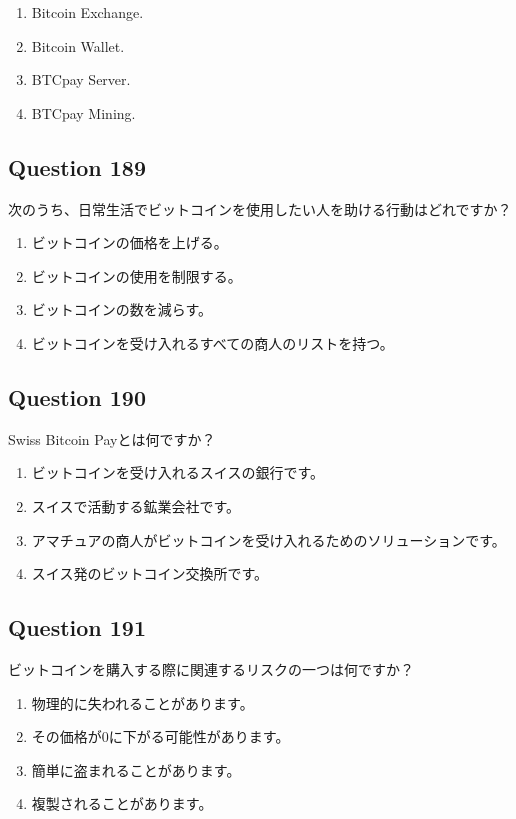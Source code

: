 \documentclass[12pt,a4paper]{article}
\begin{document}
\begin{enumerate}[label=\Alph*., leftmargin=*]
\item Bitcoin Exchange.
\item Bitcoin Wallet.
\item BTCpay Server.
\item BTCpay Mining.
\end{enumerate}

\bigskip


\subsection*{Question 189}
次のうち、日常生活でビットコインを使用したい人を助ける行動はどれですか？

\begin{enumerate}[label=\Alph*., leftmargin=*]
\item ビットコインの価格を上げる。
\item ビットコインの使用を制限する。
\item ビットコインの数を減らす。
\item ビットコインを受け入れるすべての商人のリストを持つ。
\end{enumerate}

\bigskip


\subsection*{Question 190}
Swiss Bitcoin Payとは何ですか？

\begin{enumerate}[label=\Alph*., leftmargin=*]
\item ビットコインを受け入れるスイスの銀行です。
\item スイスで活動する鉱業会社です。
\item アマチュアの商人がビットコインを受け入れるためのソリューションです。
\item スイス発のビットコイン交換所です。
\end{enumerate}

\bigskip


\subsection*{Question 191}
ビットコインを購入する際に関連するリスクの一つは何ですか？

\begin{enumerate}[label=\Alph*., leftmargin=*]
\item 物理的に失われることがあります。
\item その価格が0に下がる可能性があります。
\item 簡単に盗まれることがあります。
\item 複製されることがあります。
\end{enumerate}
\end{document}

